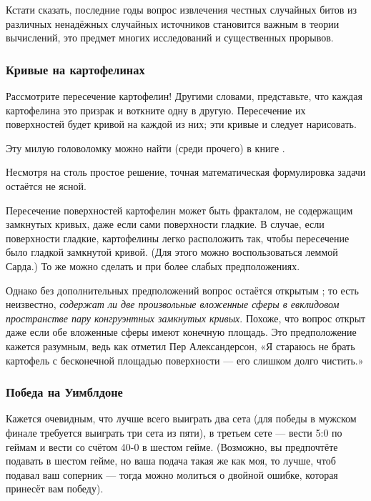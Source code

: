Кстати сказать, последние годы вопрос извлечения честных %
случайных битов из различных ненадёжных случайных источников становится важным в теории вычислений, это предмет многих исследований и существенных прорывов.

\subsubsection*{Кривые на картофелинах}

{\sloppy

Рассмотрите пересечение картофелин!
Другими словами, представьте, что каждая картофелина это призрак и воткните одну в другую.
Пересечение их поверхностей будет кривой на каждой из них; эти кривые и следует нарисовать.

}

Эту милую головоломку можно найти (среди прочего) в книге \cite{5}.

\begin{addedbytheeditors}
Несмотря на столь простое решение, точная математическая формулировка задачи остаётся не ясной.

Пересечение поверхностей картофелин может быть фракталом, не содержащим замкнутых кривых, даже если сами поверхности гладкие.
В случае, если поверхности гладкие, картофелины легко расположить так, чтобы пересечение было гладкой замкнутой кривой.
(Для этого можно воспользоваться леммой Сарда.)
То же можно сделать и при более слабых предположениях.

Однако без дополнительных предположений вопрос остаётся открытым \cite{agol};
то есть неизвестно, \emph{содержат ли две произвольные вложенные сферы в евклидовом пространстве пару конгруэнтных замкнутых кривых}. 
Похоже, что вопрос открыт даже если обе вложенные сферы имеют конечную площадь.
Это предположение кажется разумным, ведь как отметил Пер Александерсон,
«Я стараюсь не брать картофель с бесконечной площадью поверхности --- его слишком долго чистить.»\pr
\end{addedbytheeditors}

\subsubsection*{Победа на Уимблдоне}

Кажется очевидным, что лучше всего выиграть два сета (для победы в мужском финале требуется выиграть три сета из пяти), в третьем сете --- вести 5:0 по
геймам и вести со счётом 40-0 в шестом гейме.
(Возможно, вы предпочтёте подавать в шестом гейме, но ваша подача такая же как моя, то лучше, чтоб подавал ваш соперник --- тогда можно молиться о двойной ошибке, которая принесёт вам победу).


